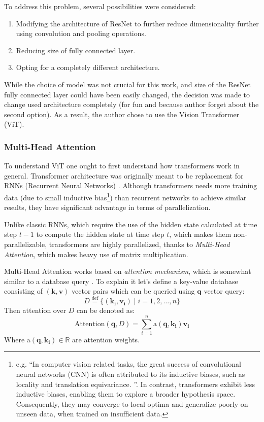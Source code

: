 To address this problem, several possibilities were considered:
\begin{enumerate}
    \item Modifying the architecture of ResNet to further reduce dimensionality further using convolution and pooling operations.
    \item Reducing size of fully connected layer.
    \item Opting for a completely different architecture.
\end{enumerate}

While the choice of model was not crucial for this work, and size of the ResNet fully connected layer could have been easily changed, the decision was made to change used architecture completely (for fun and because author forget about the second option). 
As a result, the author chose to use the Vision Transformer (ViT).

\subsubsection{Multi-Head Attention}
To understand ViT one ought to first understand how transformers work in general.
Transformer architecture was originally meant to be replacement for RNNs (Recurrent Neural Networks) \cite{Vaswani2017}.
Although transformers needs more training data (due to small inductive bias\footnote{e.g. ``In computer vision related tasks, the great success of convolutional neural networks (CNN) is often attributed to its inductive biases, such as locality and translation equivariance. \cite{Mormille2023}''. 
In contrast, transformers exhibit less inductive biases, enabling them to explore a broader hypothesis space. 
Consequently, they may converge to local optima and generalize poorly on unseen data, when trained on insufficient data.}) 
than recurrent networks to achieve similar results, they have significant advantage in terms of parallelization.

Unlike classic RNNs, which require the use of the hidden state calculated at time step $t-1$ to compute the hidden state at time step $t$, which makes them non-parallelizable, transformers are highly parallelized, thanks to \emph{Multi-Head Attention}, which makes heavy use of matrix multiplication.

Multi-Head Attention works based on \emph{attention mechanism}, which is somewhat similar to a database query \cite{d2lAttentionMechanism}.
To explain it let's define a key-value database consisting of $(\mathbf{k}, \textbf{v})$ vector pairs which can be queried using $\mathbf{q}$ vector query: \[ D\overset{\text{def}}{=}\{(\mathbf{k_i}, \mathbf{v_i}) \mid i = 1, 2, \ldots, n\}\]
Then attention over $D$ can be denoted as:
\[ \text{Attention}(\mathbf{q}, D) = \sum_{i=1}^{n}\text{a}(\mathbf{q}, \mathbf{k_i})\mathbf{v_i} \]
Where $\text{a}(\mathbf{q}, \mathbf{k_i}) \in \mathbb{R}$ are attention weights.

